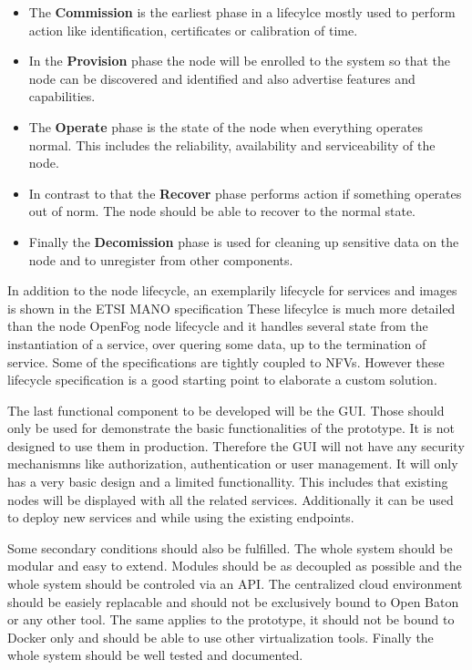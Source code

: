 \begin{itemize}
  \item The \textbf{Commission} is the earliest phase in a lifecylce mostly used to perform action like identification, certificates or calibration of time.\autocite[p. 52 f.]{OpenFog:2017}
  \item In the \textbf{Provision} phase the node will be enrolled to the system so that the node can be discovered and identified and also advertise features and capabilities.\autocite[p. 52 f.]{OpenFog:2017}
  \item The \textbf{Operate} phase is the state of the node when everything operates normal. This includes the reliability, availability and serviceability of the node.\autocite[p. 53]{OpenFog:2017}
  \item In contrast to that the \textbf{Recover} phase performs action if something operates out of norm.\autocite[p. 53]{OpenFog:2017} The node should be able to recover to the normal state.\autocite[p. 53]{OpenFog:2017}
  \item Finally the \textbf{Decomission} phase is used for cleaning up sensitive data on the node and to unregister from other components.\autocite[p. 53]{OpenFog:2017}
\end{itemize}

In addition to the node lifecycle, an exemplarily lifecycle for services and images is shown in the \ac{ETSI} \ac{MANO} specification\autocite[p. 67 ff.]{ETSI:MANO:2014}
These lifecylce is much more detailed than the node OpenFog node lifecycle and it handles several state from the instantiation of a service, over quering some data, up to the termination of service.
Some of the specifications are tightly coupled to \acp{NFV}.
However these lifecycle specification is a good starting point to elaborate a custom solution.

The last functional component to be developed will be the \ac{GUI}.
Those should only be used for demonstrate the basic functionalities of the prototype.
It is not designed to use them in production.
Therefore the \ac{GUI} will not have any security mechanismns like authorization, authentication or user management.
It will only has a very basic design and a limited functionallity.
This includes that existing nodes will be displayed with all the related services.
Additionally it can be used to deploy new services and while using the existing endpoints.

Some secondary conditions should also be fulfilled.
The whole system should be modular and easy to extend.
Modules should be as decoupled as possible and the whole system should be controled via an \ac{API}.
The centralized cloud environment should be easiely replacable and should not be exclusively bound to Open Baton or any other tool.
The same applies to the prototype, it should not be bound to Docker only and should be able to use other virtualization tools.
Finally the whole system should be well tested and documented.


